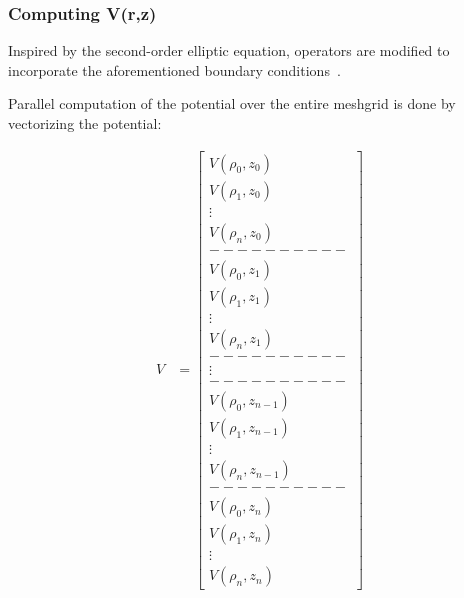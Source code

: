 

\newpage

\subsubsection*{Computing V(r,z)}

Inspired by the second-order elliptic equation, operators are modified to incorporate the aforementioned boundary conditions~\cite{Press:2007}.


Parallel computation of the potential over the entire meshgrid is done by vectorizing the potential:

\[ 
 \begin{aligned}
    V &= \begin{bmatrix}
           V(\rho_0, z_0) \\
           V(\rho_1, z_0) \\
           \vdots \\
	   V(\rho_n, z_0) \\
	   ---------- \\
	   V(\rho_0, z_1) \\
           V(\rho_1, z_1) \\
           \vdots \\
	   V(\rho_n, z_1) \\
	   ---------- \\
	   \vdots \\
	   ---------- \\
	   V(\rho_0, z_{n-1}) \\
           V(\rho_1, z_{n-1}) \\
           \vdots \\
           V(\rho_n, z_{n-1}) \\
           ---------- \\
           V(\rho_0, z_n) \\
	   V(\rho_1, z_n) \\
	   \vdots \\
	   V(\rho_n, z_n) 
         \end{bmatrix}
  \end{aligned}
\]

\newpage
\iffalse

